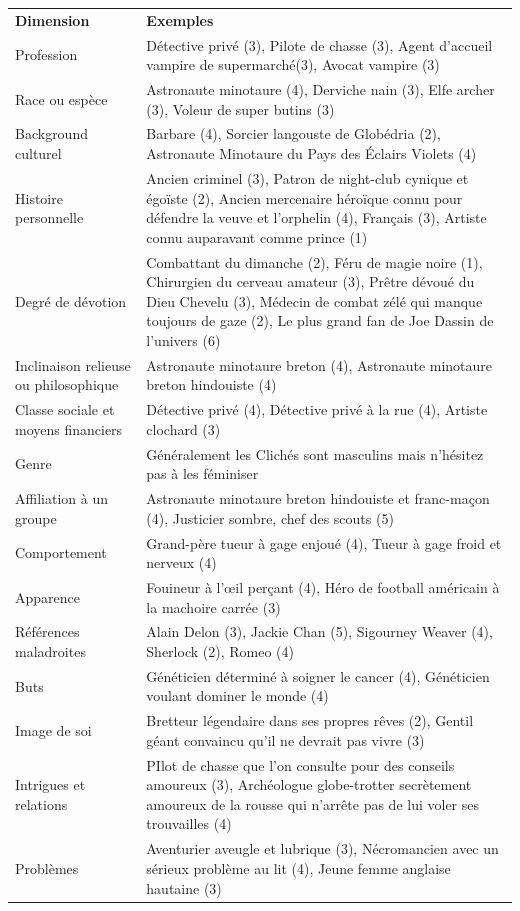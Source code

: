 \begin{frame}[b]
\begin{tabular}{p{4.5cm}p{12.5cm}}
\textbf{Dimension} & \textbf{Exemples} \\
Profession & Détective privé (3), Pilote de chasse (3), Agent d'accueil vampire de supermarché(3), Avocat vampire (3) \\
Race ou espèce & Astronaute minotaure (4), Derviche nain (3), Elfe archer (3), Voleur de super butins (3) \\
Background culturel & Barbare (4), Sorcier langouste de Globédria (2), Astronaute Minotaure du Pays des Éclairs Violets (4) \\
Histoire personnelle & Ancien criminel (3), Patron de night-club cynique et égoïste (2), Ancien mercenaire héroïque connu pour défendre la veuve et l'orphelin (4), Français (3), Artiste connu auparavant comme prince (1) \\
Degré de dévotion & Combattant du dimanche (2), Féru de magie noire (1), Chirurgien du cerveau amateur (3), Prêtre dévoué du Dieu Chevelu (3), Médecin de combat zélé qui manque toujours de gaze (2), Le plus grand fan de Joe Dassin de l'univers (6) \\
Inclinaison relieuse ou philosophique & Astronaute minotaure breton (4), Astronaute minotaure breton hindouiste (4) \\
Classe sociale et moyens financiers & Détective privé (4), Détective privé à la rue (4), Artiste clochard (3) \\
Genre & Généralement les Clichés sont masculins mais n'hésitez pas à les féminiser \\
Affiliation à un groupe & Astronaute minotaure breton hindouiste et franc-maçon (4), Justicier sombre, chef des scouts (5) \\
Comportement & Grand-père tueur à gage enjoué (4), Tueur à gage froid et nerveux (4) \\
Apparence & Fouineur à l'œil perçant (4), Héro de football américain à la machoire carrée (3) \\
Références maladroites & Alain Delon (3), Jackie Chan (5), Sigourney Weaver (4), Sherlock (2), Romeo (4) \\
Buts & Généticien déterminé à soigner le cancer (4), Généticien voulant dominer le monde (4) \\
Image de soi & Bretteur légendaire dans ses propres rêves (2), Gentil géant convaincu qu'il ne devrait pas vivre (3) \\ 
Intrigues et relations & PIlot de chasse que l'on consulte pour des conseils amoureux (3), Archéologue globe-trotter secrètement amoureux de la rousse qui n'arrête pas de lui voler ses trouvailles (4) \\
Problèmes & Aventurier aveugle et lubrique (3), Nécromancien avec un sérieux problème au lit (4), Jeune femme anglaise hautaine (3)
\end{tabular}

\end{frame}


